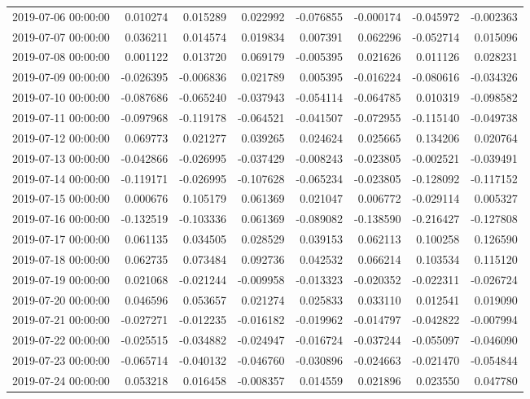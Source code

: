 \begin{tabular}{lrrrrrrr}
2019-07-06 00:00:00 & 0.010274 & 0.015289 & 0.022992 & -0.076855 & -0.000174 & -0.045972 & -0.002363 \\
2019-07-07 00:00:00 & 0.036211 & 0.014574 & 0.019834 & 0.007391 & 0.062296 & -0.052714 & 0.015096 \\
2019-07-08 00:00:00 & 0.001122 & 0.013720 & 0.069179 & -0.005395 & 0.021626 & 0.011126 & 0.028231 \\
2019-07-09 00:00:00 & -0.026395 & -0.006836 & 0.021789 & 0.005395 & -0.016224 & -0.080616 & -0.034326 \\
2019-07-10 00:00:00 & -0.087686 & -0.065240 & -0.037943 & -0.054114 & -0.064785 & 0.010319 & -0.098582 \\
2019-07-11 00:00:00 & -0.097968 & -0.119178 & -0.064521 & -0.041507 & -0.072955 & -0.115140 & -0.049738 \\
2019-07-12 00:00:00 & 0.069773 & 0.021277 & 0.039265 & 0.024624 & 0.025665 & 0.134206 & 0.020764 \\
2019-07-13 00:00:00 & -0.042866 & -0.026995 & -0.037429 & -0.008243 & -0.023805 & -0.002521 & -0.039491 \\
2019-07-14 00:00:00 & -0.119171 & -0.026995 & -0.107628 & -0.065234 & -0.023805 & -0.128092 & -0.117152 \\
2019-07-15 00:00:00 & 0.000676 & 0.105179 & 0.061369 & 0.021047 & 0.006772 & -0.029114 & 0.005327 \\
2019-07-16 00:00:00 & -0.132519 & -0.103336 & 0.061369 & -0.089082 & -0.138590 & -0.216427 & -0.127808 \\
2019-07-17 00:00:00 & 0.061135 & 0.034505 & 0.028529 & 0.039153 & 0.062113 & 0.100258 & 0.126590 \\
2019-07-18 00:00:00 & 0.062735 & 0.073484 & 0.092736 & 0.042532 & 0.066214 & 0.103534 & 0.115120 \\
2019-07-19 00:00:00 & 0.021068 & -0.021244 & -0.009958 & -0.013323 & -0.020352 & -0.022311 & -0.026724 \\
2019-07-20 00:00:00 & 0.046596 & 0.053657 & 0.021274 & 0.025833 & 0.033110 & 0.012541 & 0.019090 \\
2019-07-21 00:00:00 & -0.027271 & -0.012235 & -0.016182 & -0.019962 & -0.014797 & -0.042822 & -0.007994 \\
2019-07-22 00:00:00 & -0.025515 & -0.034882 & -0.024947 & -0.016724 & -0.037244 & -0.055097 & -0.046090 \\
2019-07-23 00:00:00 & -0.065714 & -0.040132 & -0.046760 & -0.030896 & -0.024663 & -0.021470 & -0.054844 \\
2019-07-24 00:00:00 & 0.053218 & 0.016458 & -0.008357 & 0.014559 & 0.021896 & 0.023550 & 0.047780 \\

\end{tabular}
